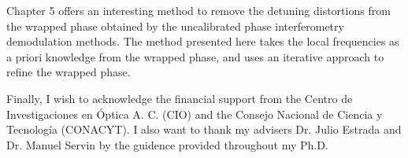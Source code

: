 Chapter 5 offers an interesting method to remove the detuning distortions from 
the wrapped phase obtained by the uncalibrated phase interferometry demodulation 
methods. The method presented here takes the local frequencies as a priori 
knowledge from the wrapped phase, and uses an iterative approach to refine the 
wrapped phase.

Finally, I wish to acknowledge the financial support from the Centro de 
Investigaciones en \'Optica A. C. (CIO) and the Consejo Nacional de Ciencia y 
Tecnolog\'ia (CONACYT). I also want to thank my advisers Dr. Julio Estrada and
Dr. Manuel Servin by the guidence provided throughout my Ph.D.